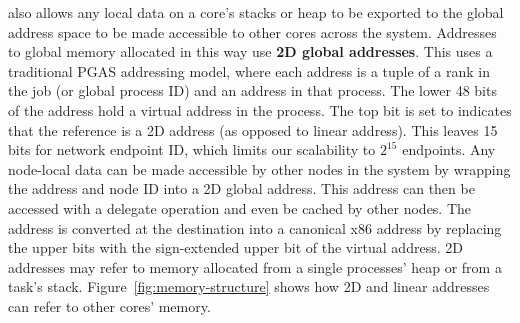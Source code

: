 \Grappa also allows any local data on a core's stacks or heap to be
exported to the global address space to be made accessible to other
cores across the system. Addresses to global memory allocated in this
way use \textbf{2D global addresses}.  This uses a traditional PGAS
addressing model, where each address is a tuple of a rank in the job (or
global process ID) and an address in that process. The lower 48 bits of
the address hold a virtual address in the process. The top bit is set to
indicates that the reference is a 2D address (as opposed to linear
address). This leaves 15 bits for network endpoint ID, which limits our
scalability to $2^{15}$ endpoints. Any node-local data can be made
accessible by other nodes in the system by wrapping the address and node
ID into a 2D global address. This address can then be accessed with a
delegate operation and even be cached by other nodes. The
address is converted at the destination into a canonical x86 address by replacing the upper
bits with the sign-extended upper bit of the virtual address. 2D
addresses may refer to memory allocated from a single processes' heap or
from a task's stack. Figure~\ref{fig:memory-structure} shows how 2D and
linear addresses can refer to other cores' memory.


